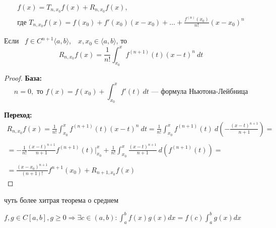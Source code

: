 \quad
\[
    \begin{gathered}
        f(x) = T_{n, x_0} f(x) + R_{n, x_0} f(x),\\
        \text{где } T_{n, x_0} f(x) = f(x_0) + f'(x_0)(x - x_0) + \dots + \frac{f^{(n)}(x_0)}{n!}(x - x_0)^n
    \end{gathered}
\]

\begin{theorem}
    
    Если \, $f \in C^{n + 1} \langle a, b \rangle$,  \,\, $x, x_0 \in \langle a, b \rangle$, то
    \[
        R_{n, x_0}f(x) = \frac{1}{n!} \int_{x_0}^x f^{(n + 1)}(t)(x-t)^n\ dt
    \]
\end{theorem}

\begin{proof}

    \textbf{\large База:} 
    \[
        n = 0, \text{ то } f(x) = f(x_0) + \int_{x_0}^{x}f'(t)\ dt  \text{ --- формула Ньютона-Лейбница}
    \]

    \textbf{\large Переход:} 
    \[
        \begin{gathered}
        R_{n, x_0}f(x) = \frac{1}{n!} \int_{x_0}^{x}f^{(n+1)}(t)(x - t)^n\ dt =
        \frac{1}{n!} \int_{x_0}^x f^{(n + 1)}(t)\ d\left(-\frac{(x - t) ^ {n + 1}}{n + 1}\right) =\\\\
        = - \frac{1}{n!} \frac{(x - t) ^ {n + 1}}{n + 1} f^{(n + 1)}(t) \bigg|_{x_0}^{x} +
        \frac{1}{n!} \int_{x_0}^{x} \frac{(x - t)^{n + 1}}{n + 1}\ d\left(f^{(n + 1)}(t)\right) =\\\\
        = \frac{(x - x_0) ^ {n + 1}}{(n + 1)!} f^{n + 1}(x_0) + R_{n + 1, x_0} f(x)
        \end{gathered}
    \]


\end{proof}


\begin{namedlemma}{чуть более хитрая теорема о среднем}
    
    $f, g \in C[a, b], g \geqslant 0 \Rightarrow \exists c \in (a, b) : \int_a^b f(x) g(x) dx = f(c) \int_a^b g(x) dx$
\end{namedlemma}

